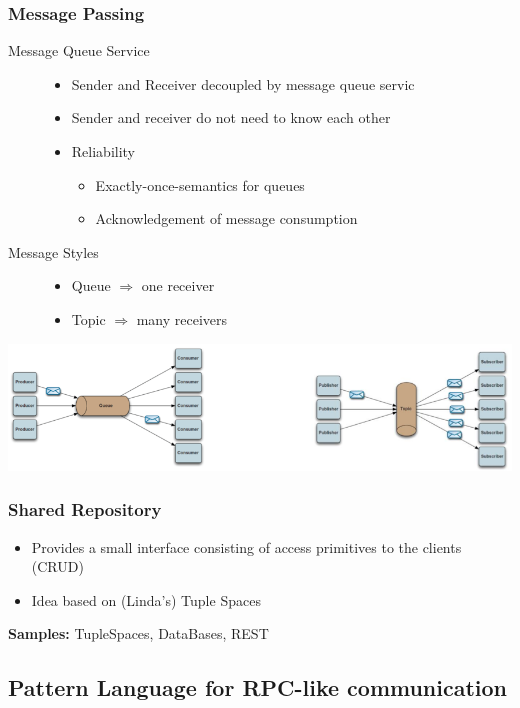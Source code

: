\documentclass[10pt]{article}
\newcommand{\Ra}{\Rightarrow}
\begin{document}
\subsubsection{Message Passing}
\begin{description}
	\item[Message Queue Service] \hfill
		\begin{itemize}
			\item Sender and Receiver decoupled by message queue servic
			\item Sender and receiver do not need to know each other
			\item Reliability
				\begin{itemize}
					\item Exactly-once-semantics for queues
					\item Acknowledgement of message consumption
				\end{itemize}
		\end{itemize}
	\item[Message Styles] \hfill
		\begin{itemize}
			\item Queue $\Ra$ one receiver
			\item Topic $\Ra$ many receivers 
		\end{itemize}
\end{description}
\begin{center}
	\includegraphics[scale=0.4]{remote-message-passing.png}
\end{center}
\subsubsection{Shared Repository}
\begin{itemize}
	\item Provides a small interface consisting of access primitives to the clients (CRUD)
	\item Idea based on (Linda's) Tuple Spaces
\end{itemize}
\textbf{Samples:} TupleSpaces, DataBases, REST
\subsection{Pattern Language for RPC-like communication}
\end{document}
